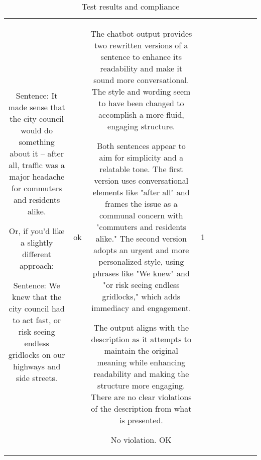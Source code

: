 \begin{table}[h!]
\begin{tabular}{|c|c|c|c|c|c|c|c|c|c|}
 Sentence: It made sense that the city council would do something about it – after all, traffic was a major headache for commuters and residents alike.

Or, if you'd like a slightly different approach:

 Sentence: We knew that the city council had to act fast, or risk seeing endless gridlocks on our highways and side streets. & ok & The chatbot output provides two rewritten versions of a sentence to enhance its readability and make it sound more conversational. The style and wording seem to have been changed to accomplish a more fluid, engaging structure. 

Both sentences appear to aim for simplicity and a relatable tone. The first version uses conversational elements like "after all" and frames the issue as a communal concern with "commuters and residents alike." The second version adopts an urgent and more personalized style, using phrases like "We knew" and "or risk seeing endless gridlocks," which adds immediacy and engagement.

The output aligns with the description as it attempts to maintain the original meaning while enhancing readability and making the structure more engaging. There are no clear violations of the description from what is presented.

No violation.
OK & 1
  \end{tabular}
  \caption{Test results and compliance}
  
  \end{table}
  
